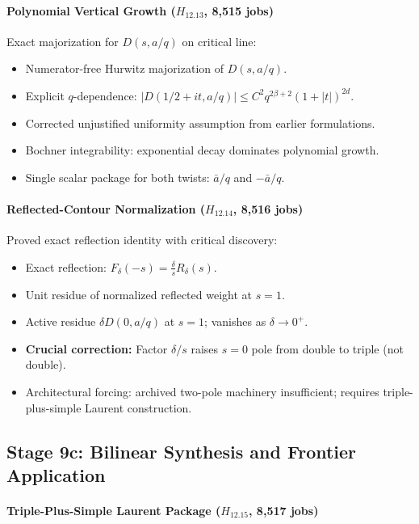 \documentclass[11pt,a4paper]{article}
\theoremstyle{plain}
\theoremstyle{definition}
\theoremstyle{remark}
\begin{document}
\paragraph{Polynomial Vertical Growth ($H_{12.13}$, 8,515 jobs)}

Exact majorization for $D(s,a/q)$ on critical line:
\begin{itemize}[leftmargin=2em]
  \item Numerator-free Hurwitz majorization of $D(s,a/q)$.
  \item Explicit $q$-dependence: $|D(1/2+it,a/q)| \le C^2 q^{2\beta+2}(1+|t|)^{2d}$.
  \item Corrected unjustified uniformity assumption from earlier formulations.
  \item Bochner integrability: exponential decay dominates polynomial growth.
  \item Single scalar package for both twists: $\bar{a}/q$ and $-\bar{a}/q$.
\end{itemize}

\paragraph{Reflected-Contour Normalization ($H_{12.14}$, 8,516 jobs)}

Proved exact reflection identity with critical discovery:
\begin{itemize}[leftmargin=2em]
  \item Exact reflection: $F_\delta(-s) = \frac{\delta}{s}R_\delta(s)$.
  \item Unit residue of normalized reflected weight at $s=1$.
  \item Active residue $\delta D(0,a/q)$ at $s=1$; vanishes as $\delta \to 0^+$.
  \item \textbf{Crucial correction:} Factor $\delta/s$ raises $s=0$ pole from double to triple (not double).
  \item Architectural forcing: archived two-pole machinery insufficient; requires triple-plus-simple Laurent construction.
\end{itemize}

\subsection{Stage 9c: Bilinear Synthesis and Frontier Application}

\paragraph{Triple-Plus-Simple Laurent Package ($H_{12.15}$, 8,517 jobs)}
\end{document}
